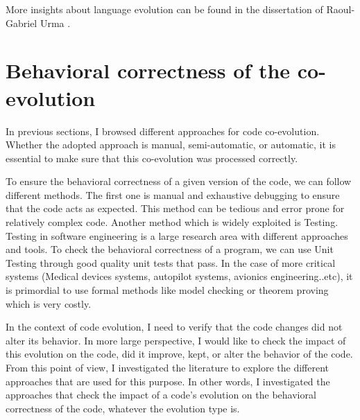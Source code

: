 More insights about language evolution can be found in the dissertation of Raoul-Gabriel Urma \cite{urma2017programming}. 
	
 \section{Behavioral correctness of the co-evolution}
 \label{behavioralcorrectness}
 
 
 
 
 
 

In previous sections, I browsed different approaches for code co-evolution. Whether the adopted approach is manual, semi-automatic, or automatic, it is essential to make sure that this co-evolution was processed correctly. 

 To ensure the behavioral correctness of a given version of the code, we can follow different methods. The first one is manual and exhaustive debugging to ensure that the code acts as expected. This method can be tedious and error prone for relatively complex code. Another method which is widely exploited is Testing. Testing in software engineering is a large research area with different approaches and tools. To check the behavioral correctness of a program, we can use Unit Testing through good quality unit tests that pass. In the case of more critical systems (Medical devices systems, autopilot systems, avionics engineering..etc), it is primordial to use formal methods like model checking or theorem proving \cite{ZHANG201312} which is very costly.
 
 In the context of code evolution, I need to verify that the code changes did not alter its behavior. 
 In more large perspective, I would like to check the impact of this evolution on the code, did it improve, kept, or alter the behavior of the code. From this point of view, I investigated the literature to explore the different approaches that are used for this purpose. In other words, I investigated the approaches that check the impact of a code's evolution on the behavioral correctness of the code, whatever the evolution type is.
 
